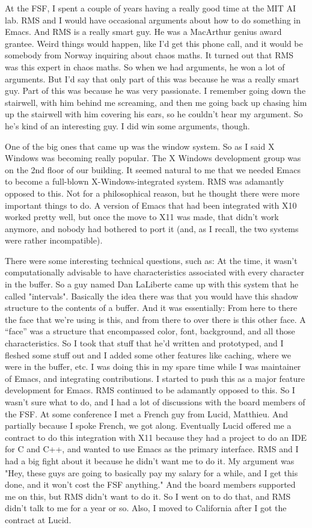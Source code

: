 \documentclass[format=acmsmall,screen]{acmart}
\begin{document}
At the FSF, I spent a couple of years having a really good time at the
MIT AI lab.  RMS and I would have occasional arguments about how to do
something in Emacs.  And RMS is a really smart guy.  He was a
MacArthur genius award grantee.  Weird things would happen, like I'd
get this phone call, and it would be somebody from Norway inquiring
about chaos maths.  It turned out that RMS was this expert in chaos
maths.  So when we had arguments, he won a lot of arguments.  But I'd
say that only part of this was because he was a really smart guy.
Part of this was because he was very passionate.  I remember going
down the stairwell, with him behind me screaming, and then me
going back up chasing him up the stairwell with him covering his ears,
so he couldn't hear my argument.  So he's kind of an interesting guy.
I did win some arguments, though.

One of the big ones that came up was the window system.  So as I said
X Windows was becoming really popular.  The X Windows development
group was on the 2nd floor of our building.  It seemed natural to me
that we needed Emacs to become a full-blown X-Windows-integrated
system.  RMS was adamantly opposed to this.  Not for a philosophical
reason, but he thought there were more important things to do.  A
version of Emacs that had been integrated with X10 worked pretty well,
but once the move to X11 was made, that didn't work anymore, and
nobody had bothered to port it (and, as I recall, the two systems were
rather incompatible).

There were some interesting technical questions, such as: At the time,
it wasn't computationally advisable to have characteristics associated
with every character in the buffer.  So a guy named Dan LaLiberte came
up with this system that he called "intervals".  Basically the idea
there was that you would have this shadow structure to the contents of
a buffer.  And it was essentially: From here to there the face that
we're using is this, and from there to over there is this other face.
A ``face'' was a structure that encompassed color, font, background, and
all
those characteristics.  So I took that stuff that he'd written and
prototyped, and I fleshed some stuff out and I added some other
features like caching, where we were in the buffer, etc.  I was doing
this in my
spare time while I was maintainer of Emacs, and integrating
contributions.  I started to push this as a major feature development
for Emacs.  RMS continued to be adamantly opposed to this.  So I
wasn't sure what to do, and I had a lot of discussions with the board
members of the FSF.  At some conference I met a French guy from Lucid,
Matthieu.  And partially because I spoke French, we got along.
Eventually Lucid offered me a contract to do this integration with X11
because they had a project to do an IDE for C and C++, and wanted to
use Emacs as the primary interface.  RMS and I had a big fight about
it because he didn't want me to do it.  My argument was "Hey, these
guys are going to basically pay my salary for a while, and I get this
done, and it won't cost the FSF anything."  And the board members
supported me on this, but RMS didn't want to do it.  So I went on to
do that, and RMS didn't talk to me for a year or so.  Also, I moved to
California after I got the contract at Lucid.
\end{document}
